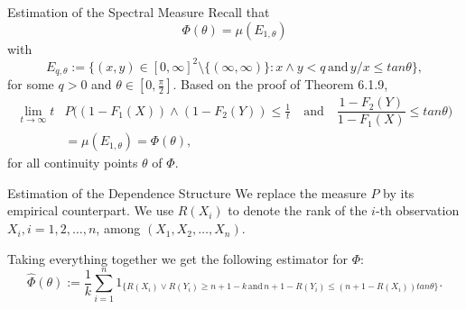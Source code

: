 \documentclass[11pt]{beamer}
\begin{document}
\begin{frame}{Estimation of the Spectral Measure}
Recall that 
\begin{displaymath}
\Phi(\theta)=\mu(E_{1,\theta})
\end{displaymath}
with
\begin{displaymath}
E_{q,\theta}:=\{ (x,y)\in [0,\infty]^2\setminus \{ (\infty,\infty)\} : x\land y<q \,\text{and}\, y/x \le tan \theta \},
\end{displaymath}
for some $q>0$ and $\theta \in [0,\frac{\pi}{2}]$.
Based on the proof of Theorem 6.1.9,
\begin{displaymath}
\begin{split}
\lim_{t\to \infty} t &P\big ( (1-F_1(X))\land (1-F_2(Y)) \le \frac{1}{t} \quad \text{and} \quad \dfrac{1-F_2(Y)}{1-F_1(X)}\le tan \theta\big) \\
&=\mu(E_{1,\theta})=\Phi(\theta),
\end{split}
\end{displaymath}
for all continuity points $\theta$ of $\Phi$.
\end{frame}
\begin{frame}{Estimation of the Dependence Structure}
We replace the measure $P$ by its empirical counterpart. We use $R(X_i)$ to denote the rank of the $i$-th observation $X_i, i=1,2,\dots,n$, among $(X_1,X_2,\dots, X_n)$.\par 
Taking everything together we get the following estimator for $\Phi$:
\begin{displaymath}
\hat{\Phi}(\theta):=\frac{1}{k} \sum_{i=1}^n 1_{\{ R(X_i) \lor R(Y_i) \ge n+1-k\, \text{and} \, n+1-R(Y_i)\le (n+1-R(X_i)) tan \theta \}}.
\end{displaymath}

\end{frame}
\end{document}
